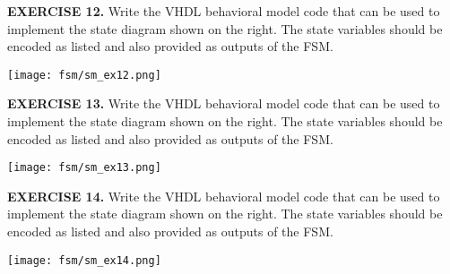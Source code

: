 \vspace{20pt}
\noindent
\begin{minipage}[t]{1\textwidth}
\textbf{EXERCISE 12.}
Write the VHDL behavioral model code that can be used to implement the state diagram shown on the right. The state variables should be encoded as listed and also provided as outputs of the FSM.
\end{minipage}
\begin{minipage}[t]{1\textwidth}
\vspace{10pt}
\centering
\texttt{[image: fsm/sm\_ex12.png]}
\end{minipage}

\vspace{20pt}
\noindent
\begin{minipage}[t]{0.5\textwidth}
\textbf{EXERCISE 13.}
Write the VHDL behavioral model code that can be used to implement the state diagram shown on the right. The state variables should be encoded as listed and also provided as outputs of the FSM.
\end{minipage}
\begin{minipage}[t]{0.47\textwidth}
\vspace{0pt}\raggedright
\centering
\texttt{[image: fsm/sm\_ex13.png]}
\end{minipage}

\vspace{20pt}
\noindent
\begin{minipage}[t]{0.5\textwidth}
\textbf{EXERCISE 14.}
Write the VHDL behavioral model code that can be used to implement the state diagram shown on the right. The state variables should be encoded as listed and also provided as outputs of the FSM.
\end{minipage}
\begin{minipage}[t]{0.47\textwidth}
\vspace{0pt}\raggedright
\centering
\texttt{[image: fsm/sm\_ex14.png]}
\end{minipage}





